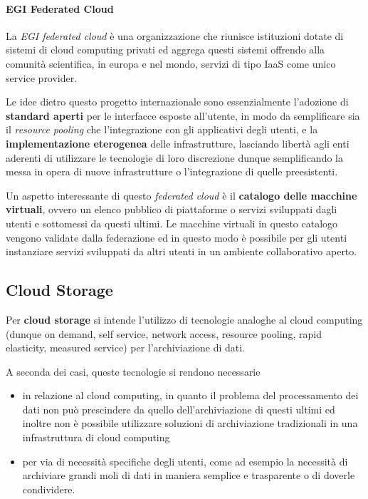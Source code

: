 \documentclass[italian,]{article}
\providecommand{\tightlist}{%
  \setlength{\itemsep}{0pt}\setlength{\parskip}{0pt}}
\let\oldparagraph\paragraph
\renewcommand{\paragraph}[1]{\oldparagraph{#1}\mbox{}}
\begin{document}
\paragraph{EGI Federated Cloud}\label{egi-federated-cloud}

La \emph{EGI federated cloud} è una organizzazione che riunisce
istituzioni dotate di sistemi di cloud computing privati ed aggrega
questi sistemi offrendo alla comunità scientifica, in europa e nel
mondo, servizi di tipo IaaS come unico service provider.

Le idee dietro questo progetto internazionale sono essenzialmente
l'adozione di \textbf{standard aperti} per le interfacce esposte
all'utente, in modo da semplificare sia il \emph{resource pooling} che
l'integrazione con gli applicativi degli utenti, e la
\textbf{implementazione eterogenea} delle infrastrutture, lasciando
libertà agli enti aderenti di utilizzare le tecnologie di loro
discrezione dunque semplificando la messa in opera di nuove
infrastrutture o l'integrazione di quelle preesistenti.

Un aspetto interessante di questo \emph{federated cloud} è il
\textbf{catalogo delle macchine virtuali}, ovvero un elenco pubblico di
piattaforme o servizi sviluppati dagli utenti e sottomessi da questi
ultimi. Le macchine virtuali in questo catalogo vengono validate dalla
federazione ed in questo modo è possibile per gli utenti instanziare
servizi sviluppati da altri utenti in un ambiente collaborativo aperto.

\subsection{Cloud Storage}\label{cloud-storage}

Per \textbf{cloud storage} si intende l'utilizzo di tecnologie analoghe
al cloud computing (dunque on demand, self service, network access,
resource pooling, rapid elasticity, measured service) per
l'archiviazione di dati.

A seconda dei casi, queste tecnologie si rendono necessarie

\begin{itemize}
\tightlist
\item
  in relazione al cloud computing, in quanto il problema del
  processamento dei dati non può prescindere da quello
  dell'archiviazione di questi ultimi ed inoltre non è possibile
  utilizzare soluzioni di archiviazione tradizionali in una
  infrastruttura di cloud computing
\item
  per via di necessità specifiche degli utenti, come ad esempio la
  necessità di archiviare grandi moli di dati in maniera semplice e
  trasparente o di doverle condividere.
\end{itemize}
\end{document}
